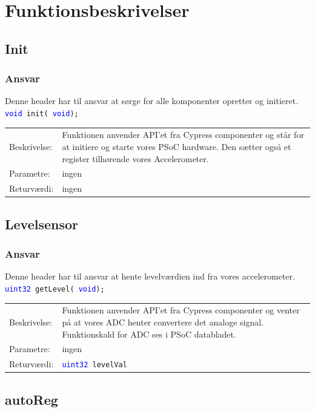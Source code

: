 \section{Funktionsbeskrivelser}
\subsection{Init}
\subsubsection{Ansvar}
Denne header har til ansvar at sørge for alle komponenter opretter og initieret.
\texttt{\textcolor{blue}{void} init( \textcolor{blue}{void});} 
\begin{table}[H]
\begin{tabular}{l p{12.5cm}}
\hline
Beskrivelse:& Funktionen anvender API'et fra Cypress componenter og står for at initiere og starte vores PSoC hardware. Den sætter også et register tilhørende vores Accelerometer. \\
Parametre:&ingen\\
Returværdi:&ingen\\
\end{tabular}
\end{table}
\subsection{Levelsensor}
\subsubsection{Ansvar}
Denne header har til ansvar at hente levelværdien ind fra vores accelerometer.
\texttt{\textcolor{blue}{uint32} getLevel( \textcolor{blue}{void});} 
\begin{table}[H]
\begin{tabular}{l p{12.5cm}}
\hline
Beskrivelse:& Funktionen anvender API'et fra Cypress componenter og venter på at vores ADC henter convertere det analoge signal. Funktionskald for ADC ses i PSoC databladet. \\
Parametre:&ingen\\
Returværdi:&\texttt{\textcolor{blue}{uint32} levelVal}\\
\end{tabular}
\end{table}
\subsection{autoReg}
